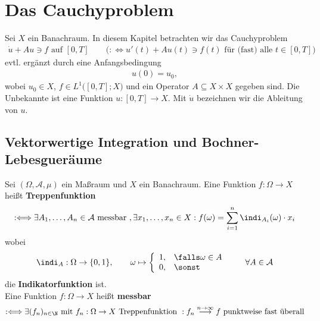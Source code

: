 
\chapter{Das Cauchyproblem}
Sei $X$ ein Banachraum. In diesem Kapitel betrachten wir das Cauchyproblem
\begin{align}\label{CauchyProblem}\tag{CP}
\dot{u}+Au\ni f\text{ auf }[0,T] \qquad\Big(:\Longleftrightarrow u'(t)+A u(t)\ni f(t)\text{ für (fast) alle }t\in[0,T]\Big)
\end{align}
evtl. ergänzt durch eine Anfangsbedingung
\begin{align*}
u(0)=u_0,
\end{align*}
wobei $u_0\in X$, $f\in L^1\big([0,T];X\big)$ und ein Operator $A\subseteq X\times X$ gegeben sind. Die Unbekannte ist eine Funktion $u:[0,T]\to X$. Mit $\dot{u}$ bezeichnen wir die Ableitung von $u$.

\section{Vektorwertige Integration und Bochner-Lebesgueräume}
Sei $(\Omega,\mathcal{A},\mu)$ ein Maßraum und $X$ ein Banachraum. Eine Funktion $f:\Omega\to X$ heißt \textbf{Treppenfunktion}
\begin{align*}
:\Longleftrightarrow\exists A_1,\ldots,A_n\in\mathcal{A}\text{ messbar },\exists x_1,\ldots,x_n\in X:f(\omega)=\sum\limits_{i=1}^n\indi_{A_i}(\omega)\cdot x_i
\end{align*}
wobei
\begin{align*}
\indi_A:\Omega\to\lbrace0,1\rbrace,\qquad\omega\mapsto\left\lbrace\begin{array}{cl}
1, & \falls \omega\in A\\
0, & \sonst
\end{array}\right.\qquad\forall A\in\mathcal{A}
\end{align*}
die \textbf{Indikatorfunktion} ist.\\
Eine Funktion $f:\Omega\to X$ heißt \textbf{messbar}
\begin{align*}
:\Longleftrightarrow\exists(f_n)_{n\in\N}\text{ mit $f_n:\Omega\to X$ Treppenfunktion }:f_n\stackrel{n\to\infty}{\longrightarrow} f\text{ punktweise fast überall}
\end{align*}

